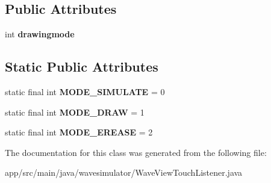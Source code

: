 \subsection*{Public Attributes}
\begin{DoxyCompactItemize}
\item 
\mbox{\label{classwavesimulator_1_1WaveViewTouchListener_a7ca3435bb1c387559ca1251e82fdf8a3}} 
int {\bfseries drawingmode}
\end{DoxyCompactItemize}
\subsection*{Static Public Attributes}
\begin{DoxyCompactItemize}
\item 
\mbox{\label{classwavesimulator_1_1WaveViewTouchListener_a1d1220dca35324db02e3ac953db358ec}} 
static final int {\bfseries M\+O\+D\+E\+\_\+\+S\+I\+M\+U\+L\+A\+TE} = 0
\item 
\mbox{\label{classwavesimulator_1_1WaveViewTouchListener_a43b9a5b29cc916665f118e4eb02ea0cd}} 
static final int {\bfseries M\+O\+D\+E\+\_\+\+D\+R\+AW} = 1
\item 
\mbox{\label{classwavesimulator_1_1WaveViewTouchListener_a362216c62634446ed74cf63bb09dfcfa}} 
static final int {\bfseries M\+O\+D\+E\+\_\+\+E\+R\+E\+A\+SE} = 2
\end{DoxyCompactItemize}


The documentation for this class was generated from the following file\+:\begin{DoxyCompactItemize}
\item 
app/src/main/java/wavesimulator/Wave\+View\+Touch\+Listener.\+java\end{DoxyCompactItemize}
